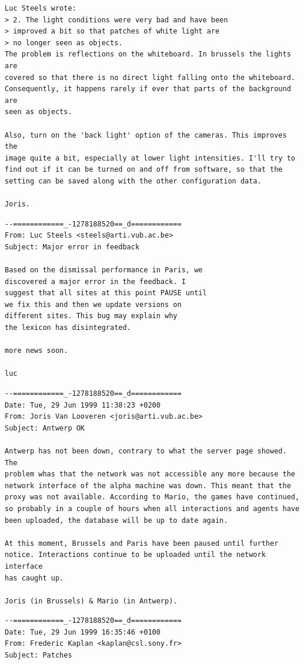 {\begin{verbatim}
Luc Steels wrote:
> 2. The light conditions were very bad and have been
> improved a bit so that patches of white light are
> no longer seen as objects.
The problem is reflections on the whiteboard. In brussels the lights are
covered so that there is no direct light falling onto the whiteboard.
Consequently, it happens rarely if ever that parts of the background are
seen as objects.

Also, turn on the 'back light' option of the cameras. This improves the
image quite a bit, especially at lower light intensities. I'll try to
find out if it can be turned on and off from software, so that the
setting can be saved along with the other configuration data.

Joris.
\end{verbatim}
\begin{verbatim}
--============_-1278188520==_d============
From: Luc Steels <steels@arti.vub.ac.be>
Subject: Major error in feedback 

Based on the dismissal performance in Paris, we
discovered a major error in the feedback. I
suggest that all sites at this point PAUSE until
we fix this and then we update versions on
different sites. This bug may explain why
the lexicon has disintegrated.

more news soon.

luc
\end{verbatim}


\footnotesize{
\begin{verbatim}
--============_-1278188520==_d============
Date: Tue, 29 Jun 1999 11:38:23 +0200
From: Joris Van Looveren <joris@arti.vub.ac.be>
Subject: Antwerp OK

Antwerp has not been down, contrary to what the server page showed. The
problem whas that the network was not accessible any more because the
network interface of the alpha machine was down. This meant that the
proxy was not available. According to Mario, the games have continued,
so probably in a couple of hours when all interactions and agents have
been uploaded, the database will be up to date again. 

At this moment, Brussels and Paris have been paused until further
notice. Interactions continue to be uploaded until the network interface
has caught up.

Joris (in Brussels) & Mario (in Antwerp).
\end{verbatim}
\begin{verbatim}
--============_-1278188520==_d============
Date: Tue, 29 Jun 1999 16:35:46 +0100
From: Frederic Kaplan <kaplan@csl.sony.fr>
Subject: Patches


\end{verbatim}}}
